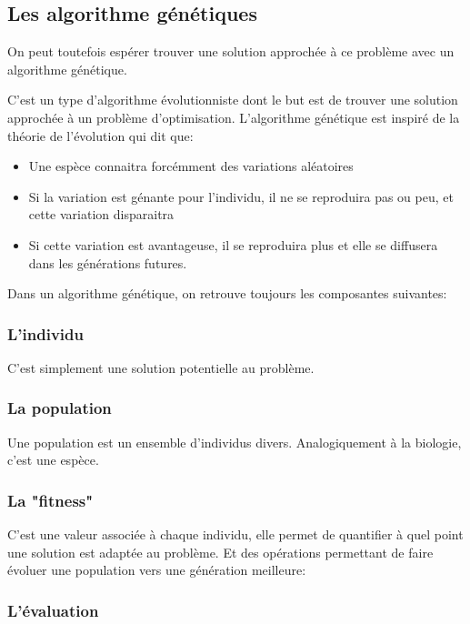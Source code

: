 \documentclass[11pt]{article}
\begin{document}
\subsection{Les algorithme génétiques}
\label{sec-1-2}

On peut toutefois espérer trouver une solution approchée à ce problème avec un algorithme génétique.

C'est un type d'algorithme évolutionniste dont le but est de trouver une solution approchée à un problème d'optimisation.
L'algorithme génétique est inspiré de la théorie de l'évolution qui dit que:
\begin{itemize}
\item Une espèce connaitra forcémment des variations aléatoires
\item Si la variation est génante pour l'individu, il ne se reproduira pas ou peu, et cette variation disparaitra
\item Si cette variation est avantageuse, il se reproduira plus et elle se diffusera dans les générations futures.
\end{itemize}

Dans un algorithme génétique, on retrouve toujours les composantes suivantes:

\subsubsection{L'individu}
\label{sec-1-2-1}

C'est simplement une solution potentielle au problème.

\subsubsection{La population}
\label{sec-1-2-2}

Une population est un ensemble d'individus divers. Analogiquement à la biologie, c'est une espèce.    

\subsubsection{La "fitness"}
\label{sec-1-2-3}

C'est une valeur associée à chaque individu, elle permet de quantifier à quel point
une solution est adaptée au problème.
Et des opérations permettant de faire évoluer une population vers une génération meilleure:

\subsubsection{L'évaluation}
\label{sec-1-2-4}
\end{document}
